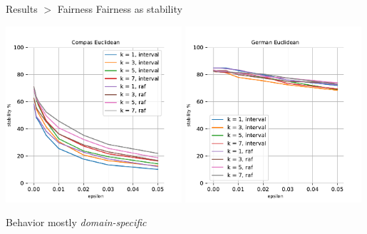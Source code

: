 \documentclass[11pt]{beamer}
\begin{document}
\begin{frame}{Results $>$ Fairness}
Fairness as stability
\begin{center}
 \includegraphics[width=0.49\textwidth]{assets/charts/compas-euclidean}
 \includegraphics[width=0.49\textwidth]{assets/charts/german-euclidean}
\end{center}
Behavior mostly \emph{domain-specific}
\end{frame}
\end{document}
